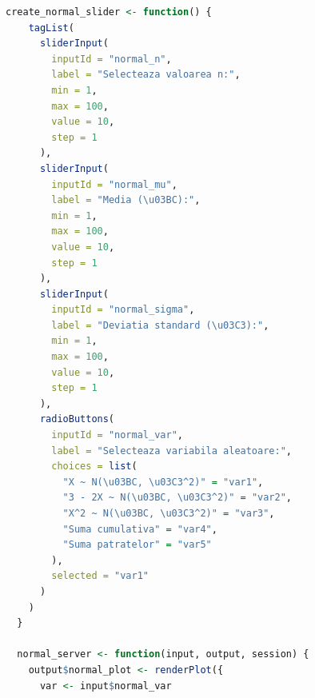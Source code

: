 \documentclass[a4paper,11pt]{article}
\begin{document}
\begin{lstlisting}[language=R]
  create_normal_slider <- function() {
    tagList(
      sliderInput(
        inputId = "normal_n",
        label = "Selecteaza valoarea n:",
        min = 1,
        max = 100,
        value = 10,
        step = 1
      ),
      sliderInput(
        inputId = "normal_mu",
        label = "Media (\u03BC):",
        min = 1,
        max = 100,
        value = 10,
        step = 1
      ),
      sliderInput(
        inputId = "normal_sigma",
        label = "Deviatia standard (\u03C3):",
        min = 1,
        max = 100,
        value = 10,
        step = 1
      ),
      radioButtons(
        inputId = "normal_var",
        label = "Selecteaza variabila aleatoare:",
        choices = list(
          "X ~ N(\u03BC, \u03C3^2)" = "var1",
          "3 - 2X ~ N(\u03BC, \u03C3^2)" = "var2",
          "X^2 ~ N(\u03BC, \u03C3^2)" = "var3",
          "Suma cumulativa" = "var4",
          "Suma patratelor" = "var5"
        ),
        selected = "var1"
      )
    )
  }
  
  normal_server <- function(input, output, session) {
    output$normal_plot <- renderPlot({
      var <- input$normal_var
      

\end{lstlisting}
\end{document}
